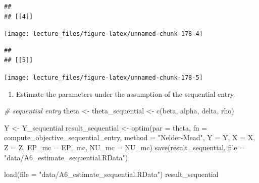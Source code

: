 \documentclass[
]{book}
\newenvironment{Shaded}{\begin{snugshade}}{\end{snugshade}}
\newcommand{\AttributeTok}[1]{\textcolor[rgb]{0.77,0.63,0.00}{#1}}
\newcommand{\CommentTok}[1]{\textcolor[rgb]{0.56,0.35,0.01}{\textit{#1}}}
\newcommand{\FunctionTok}[1]{\textcolor[rgb]{0.00,0.00,0.00}{#1}}
\newcommand{\NormalTok}[1]{#1}
\newcommand{\OtherTok}[1]{\textcolor[rgb]{0.56,0.35,0.01}{#1}}
\newcommand{\StringTok}[1]{\textcolor[rgb]{0.31,0.60,0.02}{#1}}
\providecommand{\tightlist}{%
  \setlength{\itemsep}{0pt}\setlength{\parskip}{0pt}}
\begin{document}
\begin{verbatim}
## 
## [[4]]
\end{verbatim}

\begin{center}\texttt{[image: lecture\_files/figure-latex/unnamed-chunk-178-4]} \end{center}

\begin{verbatim}
## 
## [[5]]
\end{verbatim}

\begin{center}\texttt{[image: lecture\_files/figure-latex/unnamed-chunk-178-5]} \end{center}

\begin{enumerate}
\def\labelenumi{\arabic{enumi}.}
\setcounter{enumi}{5}
\tightlist
\item
  Estimate the parameters under the assumption of the sequential entry.
\end{enumerate}

\begin{Shaded}
\begin{Highlighting}[]
\CommentTok{\# sequential entry}
\NormalTok{theta }\OtherTok{\textless{}{-}}\NormalTok{ theta\_sequential }\OtherTok{\textless{}{-}}
  \FunctionTok{c}\NormalTok{(beta, alpha, delta, rho)}
\end{Highlighting}
\end{Shaded}

\begin{Shaded}
\begin{Highlighting}[]
\NormalTok{Y }\OtherTok{\textless{}{-}}\NormalTok{ Y\_sequential}
\NormalTok{result\_sequential }\OtherTok{\textless{}{-}}
  \FunctionTok{optim}\NormalTok{(}\AttributeTok{par =}\NormalTok{ theta,}
        \AttributeTok{fn =}\NormalTok{ compute\_objective\_sequential\_entry,}
        \AttributeTok{method =} \StringTok{"Nelder{-}Mead"}\NormalTok{,}
        \AttributeTok{Y =}\NormalTok{ Y,}
        \AttributeTok{X =}\NormalTok{ X,}
        \AttributeTok{Z =}\NormalTok{ Z,}
        \AttributeTok{EP\_mc =}\NormalTok{ EP\_mc,}
        \AttributeTok{NU\_mc =}\NormalTok{ NU\_mc)}
\FunctionTok{save}\NormalTok{(result\_sequential, }\AttributeTok{file =} \StringTok{"data/A6\_estimate\_sequential.RData"}\NormalTok{)}
\end{Highlighting}
\end{Shaded}

\begin{Shaded}
\begin{Highlighting}[]
\FunctionTok{load}\NormalTok{(}\AttributeTok{file =} \StringTok{"data/A6\_estimate\_sequential.RData"}\NormalTok{)}
\NormalTok{result\_sequential}
\end{Highlighting}
\end{Shaded}
\end{document}
